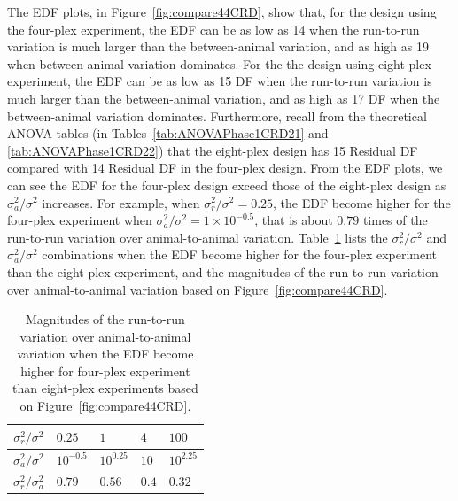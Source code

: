 The EDF plots, in Figure~\ref{fig:compare44CRD}, show that, for the design using the four-plex experiment, the EDF can be as low as 14 when the run-to-run variation is much larger than the between-animal variation, and as high as 19 when between-animal variation dominates. For the the design using eight-plex experiment, the EDF can be as low as 15 DF when the run-to-run variation is much larger than the between-animal variation, and as high as 17 DF when the between-animal variation dominates. Furthermore, recall from the theoretical ANOVA tables (in Tables~\ref{tab:ANOVAPhase1CRD21} and \ref{tab:ANOVAPhase1CRD22}) that the eight-plex design has 15 Residual DF compared with 14 Residual DF in the four-plex design. From the EDF plots, we can see the EDF for the four-plex design exceed those of the eight-plex design as $\sigma_a^2/\sigma^2$ increases. For example, when $\sigma_r^2/\sigma^2 = 0.25$, the EDF become higher for the four-plex experiment when $\sigma_a^2/\sigma^2 = 1 \times 10^{-0.5}$, that is about $0.79$ times of the run-to-run variation over animal-to-animal variation. Table~\ref{tab:edfCompare} lists the $\sigma_r^2/\sigma^2$ and $\sigma_a^2/\sigma^2$ combinations when the EDF become higher for the four-plex experiment than the eight-plex experiment, and the magnitudes of the run-to-run variation over animal-to-animal variation based on Figure~\ref{fig:compare44CRD}. 

\begin{table}[!h]
\centering
\caption{Magnitudes of the run-to-run variation over animal-to-animal variation when the EDF become higher for four-plex experiment than eight-plex experiments based on Figure~\ref{fig:compare44CRD}.}
\begin{tabular}{|c|l|l|l|l|}
\hline 
$\sigma_r^2/\sigma^2$ 	& $0.25$ & $1$ & $4$ & $100$ \\ 
\hline 
$\sigma_a^2/\sigma^2$ 	& $10^{-0.5}$ & $10^{0.25}$ & $10$ & $10^{2.25}$ \\ 
\hline 
$\sigma_r^2/\sigma_a^2$ 	 & $0.79$ & $0.56$ & $0.4$ & $0.32$ \\ 
\hline 
\end{tabular} 
\label{tab:edfCompare}
\end{table}



